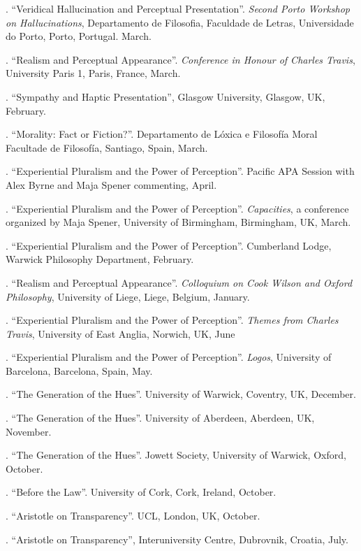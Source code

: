 \documentclass[11pt]{article}
\begin{document}
. ``Veridical Hallucination and Perceptual Presentation''. \emph{Second Porto Workshop on Hallucinations}, Departamento de Filosofia, Faculdade de Letras, Universidade do Porto, Porto, Portugal. March.

. ``Realism and Perceptual Appearance''. \emph{Conference in Honour of Charles Travis}, University Paris 1, Paris, France, March.

. ``Sympathy and Haptic Presentation'', Glasgow University, Glasgow, UK, February.

. ``Morality: Fact or Fiction?''. Departamento de Lóxica e Filosofía Moral
Facultade de Filosofía, Santiago, Spain, March.

. ``Experiential Pluralism and the Power of Perception''. Pacific APA Session with Alex Byrne and Maja Spener commenting, April.

. ``Experiential Pluralism and the Power of Perception''. \emph{Capacities}, a conference organized by Maja Spener, University of Birmingham, Birmingham, UK, March.

. ``Experiential Pluralism and the Power of Perception''. Cumberland Lodge, Warwick Philosophy Department, February.

. ``Realism and Perceptual Appearance''. \emph{Colloquium on Cook Wilson and Oxford Philosophy}, University of Liege, Liege, Belgium, January.

. ``Experiential Pluralism and the Power of Perception''. \emph{Themes from Charles Travis}, University of East Anglia, Norwich, UK, June

. ``Experiential Pluralism and the Power of Perception''. \emph{Logos}, University of Barcelona, Barcelona, Spain, May.

. ``The Generation of the Hues''. University of Warwick, Coventry, UK, December.

. ``The Generation of the Hues''. University of Aberdeen, Aberdeen, UK, November.

. ``The Generation of the Hues''. Jowett Society, University of Warwick, Oxford, October.

. ``Before the Law''. University of Cork, Cork, Ireland, October.

. ``Aristotle on Transparency''. UCL, London, UK, October.

. ``Aristotle on Transparency'', Interuniversity Centre, Dubrovnik, Croatia, July.
\end{document}
